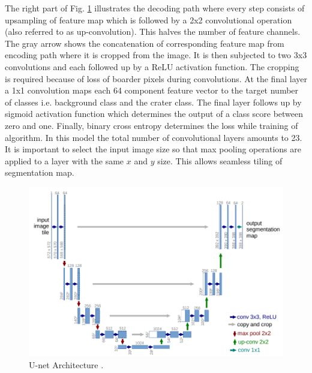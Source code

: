 \documentclass[11pt]{article}
\begin{document}

The right part of Fig. \ref{fig:U-net} illustrates the decoding path where every step consists of upsampling of feature map which is followed by a 2x2 convolutional operation (also referred to as up-convolution). This halves the number of feature channels. The gray arrow shows the concatenation of corresponding feature map from encoding path where it is cropped from the image. It is then subjected to two 3x3 convolutions and each followed up by a ReLU activation function. The cropping is required because of loss of boarder pixels during convolutions. At the final layer a 1x1 convolution maps each 64 component feature vector to the target number of classes i.e. background class and the crater class. The final layer follows up by sigmoid activation function which determines the output of a class score between zero and one. Finally, binary cross entropy determines the loss while training of algorithm. In this model the total number of convolutional layers amounts to 23. It is important to select the input image size so that max pooling operations are applied to a layer with the same $x$ and $y$ size. This allows seamless tiling of segmentation map.

\begin{figure}[ht!]
	\centering
	\includegraphics[width=.7\linewidth]{files/unet/arch.png}
	\caption{U-net Architecture \cite{ronneberger2015u}.}
	\label{fig:U-net}
\end{figure} 
\end{document}

